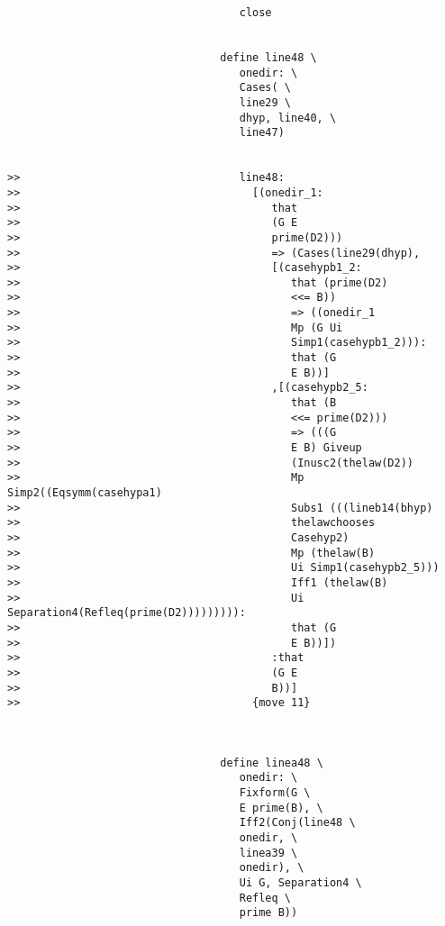 \documentclass[12pt]{article}
\begin{document}
\begin{verbatim}
                                    close


                                 define line48 \
                                    onedir: \
                                    Cases( \
                                    line29 \
                                    dhyp, line40, \
                                    line47)


>>                                  line48:
>>                                    [(onedir_1:
>>                                       that
>>                                       (G E
>>                                       prime(D2)))
>>                                       => (Cases(line29(dhyp),
>>                                       [(casehypb1_2:
>>                                          that (prime(D2)
>>                                          <<= B))
>>                                          => ((onedir_1
>>                                          Mp (G Ui
>>                                          Simp1(casehypb1_2))):
>>                                          that (G
>>                                          E B))]
>>                                       ,[(casehypb2_5:
>>                                          that (B
>>                                          <<= prime(D2)))
>>                                          => (((G
>>                                          E B) Giveup
>>                                          (Inusc2(thelaw(D2))
>>                                          Mp Simp2((Eqsymm(casehypa1)
>>                                          Subs1 (((lineb14(bhyp)
>>                                          thelawchooses
>>                                          Casehyp2)
>>                                          Mp (thelaw(B)
>>                                          Ui Simp1(casehypb2_5)))
>>                                          Iff1 (thelaw(B)
>>                                          Ui Separation4(Refleq(prime(D2))))))))):
>>                                          that (G
>>                                          E B))])
>>                                       :that
>>                                       (G E
>>                                       B))]
>>                                    {move 11}



                                 define linea48 \
                                    onedir: \
                                    Fixform(G \
                                    E prime(B), \
                                    Iff2(Conj(line48 \
                                    onedir, \
                                    linea39 \
                                    onedir), \
                                    Ui G, Separation4 \
                                    Refleq \
                                    prime B))



\end{verbatim}
\end{document}
